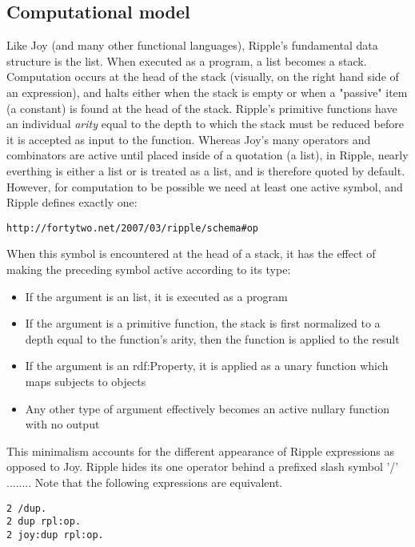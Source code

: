\documentclass[runningheads]{llncs}
\begin{document}
\subsection{Computational model}

Like Joy (and many other functional languages), Ripple's fundamental data structure is the list.  When executed as a program, a list becomes a stack.  Computation occurs at the head of the stack (visually, on the right hand side of an expression), and halts either when the stack is empty or when a "passive" item (a constant) is found at the head of the stack.  Ripple's primitive functions have an individual \textit{arity} equal to the depth to which the stack must be reduced before it is accepted as input to the function.  Whereas Joy's many operators and combinators are active until placed inside of a quotation (a list), in Ripple, nearly everthing is either a list or is treated as a list, and is therefore quoted by default.  However, for computation to be possible we need at least one active symbol, and Ripple defines exactly one:

\begin{verbatim}
http://fortytwo.net/2007/03/ripple/schema#op
\end{verbatim}

When this symbol is encountered at the head of a stack, it has the effect of making the preceding symbol active according to its type:
\begin{itemize}
\item If the argument is an list, it is executed as a program
\item If the argument is a primitive function, the stack is first normalized to a depth equal to the function's arity, then the function is applied to the result
\item If the argument is an rdf:Property, it is applied as a unary function which maps subjects to objects
\item Any other type of argument effectively becomes an active nullary function with no output
\end{itemize}

This minimalism accounts for the different appearance of Ripple expressions as opposed to Joy.  Ripple hides its one operator behind a prefixed slash symbol '/'  ........  Note that the following expressions are equivalent.

\begin{verbatim}
2 /dup.
2 dup rpl:op.
2 joy:dup rpl:op.
\end{verbatim}
\end{document}
